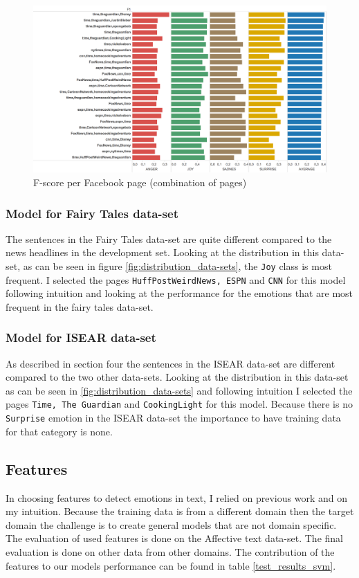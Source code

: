\documentclass[11pt]{article}
\begin{document}
\begin{figure}[htb]
  \includegraphics[width=\linewidth]{3datasets.png}
  \caption{F-score per Facebook page (combination of pages)}
  \label{fig:datasets_facebook}
\end{figure}

\subsubsection{Model for Fairy Tales data-set}
The sentences in the Fairy Tales data-set are quite different compared to the news headlines in the development set. Looking at the distribution in this data-set, as can be seen in figure \ref{fig:distribution_data-sets}, the \texttt{Joy} class is most frequent. I selected the pages \texttt{HuffPostWeirdNews, ESPN} and \texttt{CNN} for this model following intuition and looking at the performance for the emotions that are most frequent in the fairy tales data-set.

\subsubsection{Model for ISEAR data-set}
As described in section four the sentences in the ISEAR data-set are different compared to the two other data-sets. Looking at the distribution in this data-set as can be seen in \ref{fig:distribution_data-sets} and following intuition I selected the pages \texttt{Time, The Guardian} and \texttt{CookingLight} for this model. Because there is no \texttt{Surprise} emotion in the ISEAR data-set the importance to have training data for that category is none.

\subsection{Features}
In choosing features to detect emotions in text, I relied on previous work and on my intuition. Because the training data is from a different domain then the target domain the challenge is to create general models that are not domain specific. The evaluation of used features is done on the Affective text data-set. The final evaluation is done on other data from other domains. The contribution of the features to our models performance can be found in table \ref{test_results_svm}.
\end{document}
